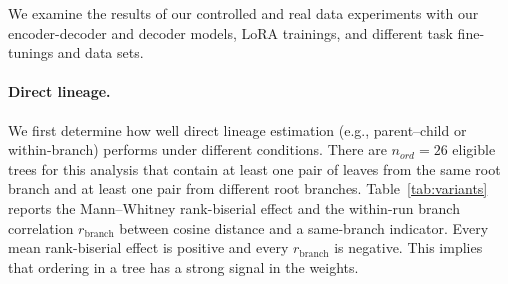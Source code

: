 \documentclass{article}
\theoremstyle{definition}
\theoremstyle{plain}
\begin{document}

We examine the results of our controlled and real data experiments with our encoder-decoder and decoder models, LoRA trainings, and different task fine-tunings and data sets.


\paragraph{Direct lineage.}
We first determine how well direct lineage estimation (e.g., parent--child or within-branch) performs under different conditions. There are $n_{ord}=26$ eligible trees for this analysis that contain at least one pair of leaves from the same root branch and at least one pair from different root branches. Table~\ref{tab:variants} reports the Mann--Whitney rank-biserial effect and the within-run branch correlation $r_{\mathrm{branch}}$ between cosine distance and a same-branch indicator. Every mean rank-biserial effect is positive and every $r_{\mathrm{branch}}$ is negative. This implies that ordering in a tree has a strong signal in the weights.
\end{document}
